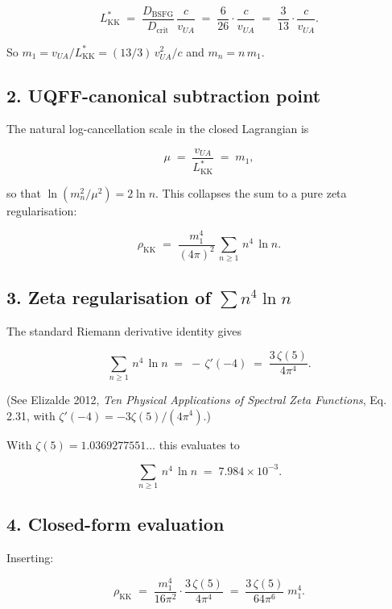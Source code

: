 \documentclass[
]{article}
\begin{document}
\[
L_{\mathrm{KK}}^{*} \;=\; \frac{D_{\mathrm{BSFG}}}{D_{\mathrm{crit}}}\,
                       \frac{c}{v_{UA}}
                  \;=\; \frac{6}{26}\cdot\frac{c}{v_{UA}}
                  \;=\; \frac{3}{13}\cdot\frac{c}{v_{UA}}.
\]

So \(m_1 = v_{UA}/L_{\mathrm{KK}}^{*} = (13/3)\,v_{UA}^{2}/c\) and
\(m_n = n\,m_1\).

\subsection{2. UQFF-canonical subtraction
point}\label{uqff-canonical-subtraction-point}

The natural log-cancellation scale in the closed Lagrangian is

\[
\mu \;=\; \frac{v_{UA}}{L_{\mathrm{KK}}^{*}} \;=\; m_{1},
\]

so that \(\ln(m_{n}^{2}/\mu^{2}) = 2\ln n\). This collapses the sum to a
pure zeta regularisation:

\[
\rho_{\mathrm{KK}}
\;=\; \frac{m_{1}^{4}}{(4\pi)^{2}}\,\sum_{n\ge 1}\,n^{4}\,\ln n.
\]

\subsection{\texorpdfstring{3. Zeta regularisation of
\(\sum n^{4}\ln n\)}{3. Zeta regularisation of \textbackslash sum n\^{}\{4\}\textbackslash ln n}}\label{zeta-regularisation-of-sum-n4ln-n}

The standard Riemann derivative identity gives

\[
\sum_{n\ge 1}\,n^{4}\,\ln n \;=\; -\,\zeta'(-4) \;=\; \frac{3\,\zeta(5)}{4\pi^{4}}.
\]

(See Elizalde 2012, \emph{Ten Physical Applications of Spectral Zeta
Functions}, Eq. 2.31, with \(\zeta'(-4)=-3\zeta(5)/(4\pi^{4})\).)

With \(\zeta(5) = 1.0369277551\ldots\) this evaluates to

\[
\sum_{n\ge 1}\,n^{4}\,\ln n \;=\; 7.984\times 10^{-3}.
\]

\subsection{4. Closed-form evaluation}\label{closed-form-evaluation}

Inserting:

\[
\rho_{\mathrm{KK}}
\;=\; \frac{m_{1}^{4}}{16\pi^{2}}\cdot\frac{3\,\zeta(5)}{4\pi^{4}}
\;=\; \frac{3\,\zeta(5)}{64\pi^{6}}\;m_{1}^{4}.
\]
\end{document}
